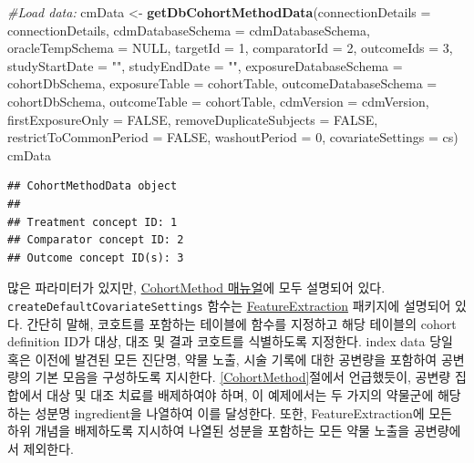 \documentclass[10.5pt]{book}
\newenvironment{Shaded}{\begin{snugshade}}{\end{snugshade}}
\newcommand{\KeywordTok}[1]{\textcolor[rgb]{0.13,0.29,0.53}{\textbf{#1}}}
\newcommand{\DataTypeTok}[1]{\textcolor[rgb]{0.13,0.29,0.53}{#1}}
\newcommand{\DecValTok}[1]{\textcolor[rgb]{0.00,0.00,0.81}{#1}}
\newcommand{\StringTok}[1]{\textcolor[rgb]{0.31,0.60,0.02}{#1}}
\newcommand{\CommentTok}[1]{\textcolor[rgb]{0.56,0.35,0.01}{\textit{#1}}}
\newcommand{\OtherTok}[1]{\textcolor[rgb]{0.56,0.35,0.01}{#1}}
\newcommand{\NormalTok}[1]{#1}
\theoremstyle{definition}
\theoremstyle{definition}
\theoremstyle{definition}
\theoremstyle{remark}
\begin{document}
\begin{Shaded}
\begin{Highlighting}[]
\CommentTok{#Load data:}
\NormalTok{cmData <-}\StringTok{ }\KeywordTok{getDbCohortMethodData}\NormalTok{(}\DataTypeTok{connectionDetails =}\NormalTok{ connectionDetails,}
                                \DataTypeTok{cdmDatabaseSchema =}\NormalTok{ cdmDatabaseSchema,}
                                \DataTypeTok{oracleTempSchema =} \OtherTok{NULL}\NormalTok{,}
                                \DataTypeTok{targetId =} \DecValTok{1}\NormalTok{,}
                                \DataTypeTok{comparatorId =} \DecValTok{2}\NormalTok{,}
                                \DataTypeTok{outcomeIds =} \DecValTok{3}\NormalTok{,}
                                \DataTypeTok{studyStartDate =} \StringTok{""}\NormalTok{,}
                                \DataTypeTok{studyEndDate =} \StringTok{""}\NormalTok{,}
                                \DataTypeTok{exposureDatabaseSchema =}\NormalTok{ cohortDbSchema,}
                                \DataTypeTok{exposureTable =}\NormalTok{ cohortTable,}
                                \DataTypeTok{outcomeDatabaseSchema =}\NormalTok{ cohortDbSchema,}
                                \DataTypeTok{outcomeTable =}\NormalTok{ cohortTable,}
                                \DataTypeTok{cdmVersion =}\NormalTok{ cdmVersion,}
                                \DataTypeTok{firstExposureOnly =} \OtherTok{FALSE}\NormalTok{,}
                                \DataTypeTok{removeDuplicateSubjects =} \OtherTok{FALSE}\NormalTok{,}
                                \DataTypeTok{restrictToCommonPeriod =} \OtherTok{FALSE}\NormalTok{,}
                                \DataTypeTok{washoutPeriod =} \DecValTok{0}\NormalTok{,}
                                \DataTypeTok{covariateSettings =}\NormalTok{ cs)}
\NormalTok{cmData}
\end{Highlighting}
\end{Shaded}

\begin{verbatim}
## CohortMethodData object
## 
## Treatment concept ID: 1
## Comparator concept ID: 2
## Outcome concept ID(s): 3
\end{verbatim}

많은 파라미터가 있지만,
\href{https://ohdsi.github.io/CohortMethod/reference/}{CohortMethod
매뉴얼}에 모두 설명되어 있다. \texttt{createDefaultCovariateSettings}
함수는
\href{https://ohdsi.github.io/FeatureExtraction/}{FeatureExtraction}
패키지에 설명되어 있다. 간단히 말해, 코호트를 포함하는 테이블에 함수를
지정하고 해당 테이블의 cohort definition ID가 대상, 대조 및 결과
코호트를 식별하도록 지정한다. index data 당일 혹은 이전에 발견된 모든
진단명, 약물 노출, 시술 기록에 대한 공변량을 포함하여 공변량의 기본
모음을 구성하도록 지시한다. \ref{CohortMethod}절에서 언급했듯이, 공변량
집합에서 대상 및 대조 치료를 배제하여야 하며, 이 예제에서는 두 가지의
약물군에 해당하는 성분명 ingredient을 나열하여 이를 달성한다. 또한,
FeatureExtraction에 모든 하위 개념을 배제하도록 지시하여 나열된 성분을
포함하는 모든 약물 노출을 공변량에서 제외한다.
\end{document}

